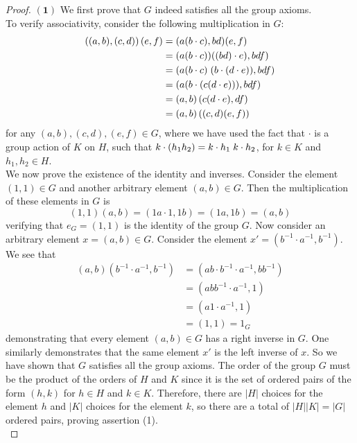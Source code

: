 \documentclass[11pt]{article}
\begin{document}
\begin{proof}
$\mathbf{(1)}$ We first prove that $G$ indeed satisfies all the group axioms. \\
To verify associativity, consider the following multiplication in $G$:
\begin{align}
\left((a,b), (c,d) \right) (e,f) &= (a (b \cdot c), bd) (e,f) \\
&= (a (b\cdot c)) ((bd) \cdot e), bdf) \\
&= (a (b\cdot c) \hspace{0.1 cm} (b \cdot (d \cdot e)), bdf) \\
&= (a (b\cdot  (c (d \cdot e))), bdf) \\
&= (a, b) \left( c(d \cdot e), df\right) \\
&= (a,b) \left( (c,d)(e,f) \right) 
\end{align}
for any $(a,b), (c,d), (e,f) \in G$, where we have used the fact that $\cdot$ is a group action of $K$ on $H$, such that $k \cdot (h_1 h_2) = k\cdot h_1 \hspace{0.1 cm} k \cdot h_2$, for $k \in K$ and $h_1, h_2 \in H$. \\
We now prove the existence of the identity and inverses. Consider the element $(1,1) \in G$ and another arbitrary element $(a,b) \in G$. Then the multiplication of these elements in $G$ is
\begin{equation}
(1,1)(a,b) = (1a \cdot 1, 1b) = (1a, 1b) = (a, b)
\end{equation}
verifying that $e_G = (1,1)$ is the identity of the group $G$. Now consider an arbitrary element $x = (a,b) \in G$. Consider the element $x' = (b^{-1} \cdot a^{-1}, b^{-1})$. We see that
\begin{align}
(a, b) (b^{-1} \cdot a^{-1}, b^{-1}) &= (a b \cdot b^{-1} \cdot a^{-1}, bb^{-1}) \\
& = (a bb^{-1} \cdot a^{-1}, 1) \\
& = (a 1\cdot a^{-1}, 1) \\
& = (1,1) = 1_G
\end{align}
demonstrating that every element $(a,b) \in G$ has a right inverse in $G$. One similarly demonstrates that the same element $x'$ is the left inverse of $x$. So we have shown that $G$ satisfies all the group axioms. The order of the group $G$ must be the product of the orders of $H$ and $K$ since it is the set of ordered pairs of the form $(h,k)$ for $h \in H$ and $k \in K$. Therefore, there are $|H|$ choices for the element $h$ and $|K|$ choices for the element $k$, so there are a total of $|H| |K| = |G|$ ordered pairs, proving assertion (1).\\

\end{proof}
\end{document}
